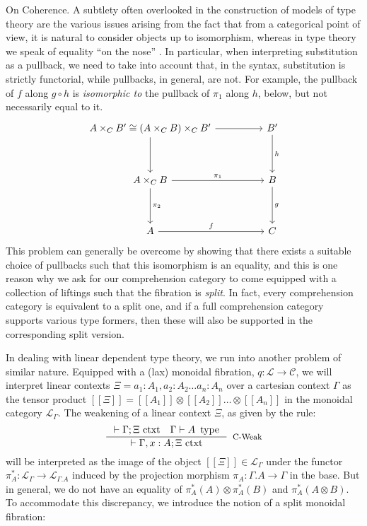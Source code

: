 \documentclass[a4paper,english]{lipics-v2018}
\DeclareMathOperator{\type}{\text{ type}}
\begin{document}
\begin{remark}On Coherence. A subtlety often overlooked in the construction of models of type theory are the various issues arising from the fact that from a categorical point of view, it is natural to consider objects up to isomorphism, whereas in type theory we speak of equality ``on the nose'' \cite{lccc}. In particular, when interpreting substitution as a pullback, we need to take into account that, in the syntax, substitution is strictly functorial, while pullbacks, in general, are not. For example, the pullback of $f$ along $g \circ h$ is \textit{isomorphic to} the pullback of $\pi_1$ along $h$, below, but not necessarily equal to it.
  \[
    \begin{tikzcd}[row sep=huge, column sep=huge]
    A \times_C B' \cong (A \times_C B) \times_C B'  \ar[r] \ar[d] & B' \ar[d, "h"]\\
    A \times_C B \ar[r, "\pi_1"] \ar[d, "\pi_2"] & B \ar[d, "g"]\\
    A \ar[r,"f"] & C
    \end{tikzcd}
  \]
  This problem can generally be overcome by showing that there exists a suitable choice of pullbacks such that this isomorphism is an equality, and this is one reason why we ask for our comprehension category to come equipped with a collection of liftings such that the fibration is \textit{split}. In fact, every comprehension category is equivalent to a split one, and if a full comprehension category supports various type formers, then these will also be supported in the corresponding split version. \cite{pllcoherence}

  
  In dealing with linear dependent type theory, we run into another problem of similar nature. Equipped with a (lax) monoidal fibration, $q : \mathcal{L} \to \mathcal{C}$, we will interpret linear contexts $\Xi = a_1 : A_1, a_2 : A_2 \dots a_n : A_n$ over a cartesian context $\Gamma$ as the tensor product $[[\Xi]] = [[A_1]] \otimes [[A_2]] \dots \otimes [[A_n]]$ in the monoidal category $\mathcal{L}_\Gamma$. The weakening of a linear context $\Xi$, as given by the rule:
  \[\inference{\vdash \Gamma; \Xi \text{ ctxt} \quad \Gamma \vdash A \type}{\vdash \Gamma, x : A; \Xi \text{ ctxt}}[C-Weak]
  \]
  will be interpreted as the image of the object $[[\Xi]] \in \mathcal{L}_\Gamma$ under the functor $\pi_A^* : \mathcal{L}_\Gamma \to \mathcal{L}_{\Gamma.A}$ induced by the projection morphism $\pi_A : \Gamma.A \to \Gamma$ in the base. But in general, we do not have an equality of $\pi_A^*(A) \otimes \pi_A^*(B)$ and $\pi_A^*(A \otimes B)$. To accommodate this discrepancy, we introduce the notion of a split monoidal fibration:
\end{remark}
\end{document}
